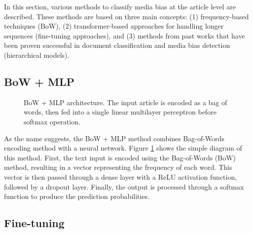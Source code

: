 In this section, various methods to classify media bias at the article level are described. These methods are based on three main concepts: (1) frequency-based techniques (BoW), (2) transformer-based approaches for handling longer sequences (fine-tuning approaches), and (3) methods from past works that have been proven successful in document classification and media bias detection (hierarchical models).


\subsection{BoW + MLP}

\begin{figure}[htbp]
    \centering
    \caption{BoW + MLP architecture. The input article is encoded as a bag of words, then fed into a single linear multilayer perceptron before softmax operation.}
    \label{fig:bow_mlp_architecture}
\end{figure}

As the name suggests, the BoW + MLP method combines Bag-of-Words encoding method with a neural network. Figure \ref{fig:bow_mlp_architecture} shows the simple diagram of this method. First, the text input is encoded using the Bag-of-Words (BoW) method, resulting in a vector representing the frequency of each word. This vector is then passed through a dense layer with a ReLU activation function, followed by a dropout layer. Finally, the output is processed through a softmax function to produce the prediction probabilities.

\subsection{Fine-tuning}

